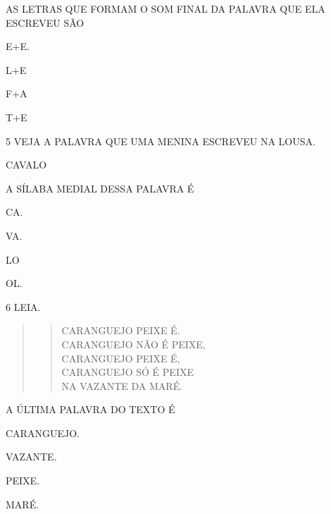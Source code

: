 AS LETRAS QUE FORMAM O SOM FINAL DA PALAVRA QUE ELA ESCREVEU SÃO

\begin{escolha}
\item E+E.

\item L+E

\item F+A

\item T+E
\end{escolha}

\num{5} VEJA A PALAVRA QUE UMA MENINA ESCREVEU NA LOUSA.

\begin{myquote}
CAVALO
\end{myquote}

A SÍLABA MEDIAL DESSA PALAVRA É

\begin{escolha}
\item CA.

\item VA.

\item LO

\item OL.
\end{escolha}

\pagebreak
\num{6} LEIA.

\begin{quote}
\begin{verse}
CARANGUEJO PEIXE É.\\
CARANGUEJO NÃO É PEIXE,\\
CARANGUEJO PEIXE É,\\
CARANGUEJO SÓ É PEIXE\\
NA VAZANTE DA MARÉ.
\end{verse}

\end{quote}

A ÚLTIMA PALAVRA DO TEXTO É

\begin{escolha}
\item CARANGUEJO.

\item VAZANTE.

\item PEIXE.

\item MARÉ.
\end{escolha}

